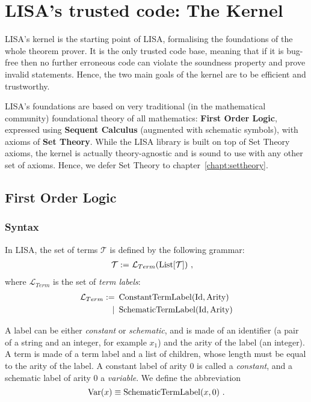 \chapter{LISA's trusted code: The Kernel}
\label{chapt:kernel}
LISA's kernel is the starting point of LISA, formalising the foundations of the whole theorem prover. It is the only trusted code base, meaning that if it is bug-free then no further erroneous code can violate the soundness property and prove invalid statements. Hence, the two main goals of the kernel are to be efficient and trustworthy. 


LISA's foundations are based on very traditional (in the mathematical community) foundational theory of all mathematics: \textbf{First Order Logic}, expressed using \textbf{Sequent Calculus} (augmented with schematic symbols), with axioms of \textbf{Set Theory}.
While the LISA library is built on top of Set Theory axioms, the kernel is actually theory-agnostic and is sound to use with any other set of axioms. Hence, we defer Set Theory to chapter~\ref{chapt:settheory}.

\section{First Order Logic}
\label{sect:FOL}
\subsection{Syntax}
\begin{defin}[Terms]
  In LISA, the set of terms $\mathcal{T}$ is defined by the following grammar:
  \begin{align}
    \mathcal{T} := & ~\mathcal{L}_{Term}(\operatorname{List}[\mathcal{T}])~,
  \end{align}
  where $\mathcal{L}_{Term}$ is the set of \textit{term labels}:
  \begin{align}
    \mathcal{L}_{Term} := & ~\operatorname{ConstantTermLabel}(\textnormal{Id}, \textnormal{Arity})  \\ 
    \mid                  & ~\operatorname{SchematicTermLabel}(\textnormal{Id}, \textnormal{Arity}) 
  \end{align}

  A label can be either \textit{constant} or \textit{schematic}, and is made of an identifier (a pair of a string and an integer, for example $x_1$) and the arity of the label (an integer).
  A term is made of a term label and a list of children, whose length must be equal to the arity of the label.
  A constant label of arity $0$ is called a \emph{constant}, and a schematic label of arity $0$ a \emph{variable}.
  We define the abbreviation
  $$
    \operatorname{Var}(x) \equiv \operatorname{SchematicTermLabel}(x, 0)~.
  $$
\end{defin}

